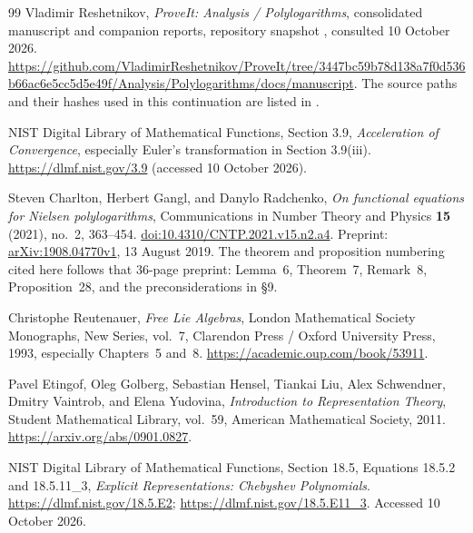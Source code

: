 \begin{thebibliography}{99}
Vladimir Reshetnikov, \emph{ProveIt: Analysis / Polylogarithms},
consolidated manuscript and companion reports,
repository snapshot ,
consulted 10 October 2026.
\url{https://github.com/VladimirReshetnikov/ProveIt/tree/3447bc59b78d138a7f0d536b66ac6e5cc5d5e49f/Analysis/Polylogarithms/docs/manuscript}.
The source paths and their hashes used in this continuation are listed
in .

NIST Digital Library of Mathematical Functions,
Section 3.9, \emph{Acceleration of Convergence}, especially
Euler's transformation in Section 3.9(iii).
\url{https://dlmf.nist.gov/3.9} (accessed 10 October 2026).


Steven Charlton, Herbert Gangl, and Danylo Radchenko,
\emph{On functional equations for Nielsen polylogarithms},
Communications in Number Theory and Physics \textbf{15} (2021), no.~2,
363--454.
\href{https://doi.org/10.4310/CNTP.2021.v15.n2.a4}{doi:10.4310/CNTP.2021.v15.n2.a4}.
Preprint: \href{https://arxiv.org/abs/1908.04770}{arXiv:1908.04770v1},
13 August 2019.
The theorem and proposition numbering cited here follows that
36-page preprint: Lemma~6, Theorem~7, Remark~8, Proposition~28,
and the preconsiderations in \S9.

Christophe Reutenauer,
\emph{Free Lie Algebras},
London Mathematical Society Monographs, New Series, vol.~7,
Clarendon Press / Oxford University Press, 1993,
especially Chapters~5 and~8.
\url{https://academic.oup.com/book/53911}.

Pavel Etingof, Oleg Golberg, Sebastian Hensel, Tiankai Liu,
Alex Schwendner, Dmitry Vaintrob, and Elena Yudovina,
\emph{Introduction to Representation Theory},
Student Mathematical Library, vol.~59,
American Mathematical Society, 2011.
\url{https://arxiv.org/abs/0901.0827}.

NIST Digital Library of Mathematical Functions,
Section 18.5, Equations 18.5.2 and 18.5.11\_3,
\emph{Explicit Representations: Chebyshev Polynomials}.
\url{https://dlmf.nist.gov/18.5.E2};
\url{https://dlmf.nist.gov/18.5.E11_3}.
Accessed 10 October 2026.


\end{thebibliography}
